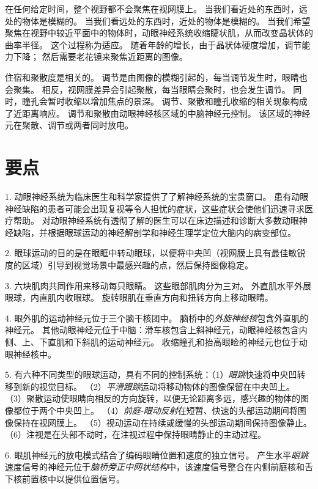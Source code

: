 在任何给定时间，整个视野都不会聚焦在视网膜上。
当我们看近处的东西时，远处的物体是模糊的。
当我们看远处的东西时，近处的物体是模糊的。
当我们希望聚焦在视野中较近平面中的物体时，动眼神经系统收缩睫状肌，从而改变晶状体的曲率半径。
这个过程称为适应。
随着年龄的增长，由于晶状体硬度增加，调节能力下降；
然后需要老花镜来聚焦近距离的图像。


住宿和聚散度是相关的。
调节是由图像的模糊引起的，每当调节发生时，眼睛也会聚集。
相反，视网膜差异会引起聚散，每当眼睛会聚时，也会发生调节。
同时，瞳孔会暂时收缩以增加焦点的景深。
调节、聚散和瞳孔收缩的相关现象构成了近距离响应。
调节和聚散由动眼神经核区域的中脑神经元控制。
该区域的神经元在聚散、调节或两者同时放电。



\section{要点}

1. 动眼神经系统为临床医生和科学家提供了了解神经系统的宝贵窗口。
患有动眼神经缺陷的患者可能会出现复视等令人担忧的症状，这些症状会使他们迅速寻求医疗帮助。
对动眼神经系统有透彻了解的医生可以在床边描述和诊断大多数动眼神经缺陷，并根据眼球运动的神经解剖学和神经生理学定位大脑内的病变部位。


2. 眼球运动的目的是在眼眶中转动眼球，以便将中央凹（视网膜上具有最佳敏锐度的区域）引导到视觉场景中最感兴趣的点，然后保持图像稳定。


3. 六块肌肉共同作用来移动每只眼睛。
这些眼部肌肉分为三对。
外直肌水平外展眼球，内直肌内收眼球。
旋转眼肌在垂直方向和扭转方向上移动眼睛。


4. 眼外肌的运动神经元位于三个脑干核团中。
脑桥中的\textit{外旋神经核}包含外直肌的神经元。
其他动眼神经元位于中脑：滑车核包含上斜神经元，动眼神经核包含内侧、上、下直肌和下斜肌的运动神经元。
收缩瞳孔和抬高眼睑的神经元也位于动眼神经核中。


5. 有六种不同类型的眼球运动，具有不同的控制系统：（1）\textit{眼跳}快速将中央凹转移到新的视觉目标。
（2）\textit{平滑跟踪}运动将移动物体的图像保留在中央凹上。
（3）聚散运动使眼睛向相反的方向旋转，以便无论距离多远，感兴趣的物体的图像都位于两个中央凹上。
（4）\textit{前庭-眼动反射}在短暂、快速的头部运动期间将图像保持在视网膜上。
（5）视动运动在持续或缓慢的头部运动期间保持图像静止。
（6）注视是在头部不动时，在注视过程中保持眼睛静止的主动过程。


6. 眼肌神经元的放电模式结合了编码眼睛位置和速度的独立信号。
产生水平\textit{眼跳}速度信号的神经元位于\textit{脑桥旁正中网状结构}中，该速度信号整合在内侧前庭核和舌下核前置核中以提供位置信号。


